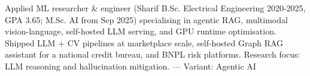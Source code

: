 \small{Applied ML researcher \& engineer (Sharif B.Sc. Electrical Engineering 2020-2025, GPA 3.65; M.Sc. AI from Sep 2025) specialising in agentic RAG, multimodal vision-language, self-hosted LLM serving, and GPU runtime optimisation. Shipped LLM + CV pipelines at marketplace scale, self-hosted Graph RAG assistant for a national credit bureau, and BNPL risk platforms. Research focus: LLM reasoning and hallucination mitigation.
 — Variant: Agentic AI}
